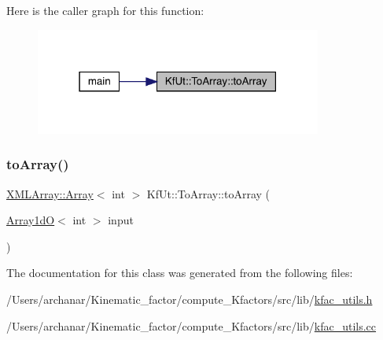 Here is the caller graph for this function\+:
\nopagebreak
\begin{figure}[H]
\begin{center}
\leavevmode
\includegraphics[width=267pt]{d3/dec/classKfUt_1_1ToArray_ac97892c7b8ae265fe9d91d3f823b3f98_icgraph}
\end{center}
\end{figure}
\mbox{\label{classKfUt_1_1ToArray_a272ebce4969f38835c7a503a85a4f8d3}} 
\subsubsection{\texorpdfstring{toArray()}{toArray()}\hspace{0.1cm}{\footnotesize\ttfamily [2/2]}}
{\footnotesize\ttfamily \mbox{\hyperlink{classXMLArray_1_1Array}{X\+M\+L\+Array\+::\+Array}}$<$ int $>$ Kf\+Ut\+::\+To\+Array\+::to\+Array (\begin{DoxyParamCaption}\item[{\mbox{\hyperlink{classADAT_1_1Array1dO}{Array1dO}}$<$ int $>$}]{input }\end{DoxyParamCaption})\hspace{0.3cm}{\ttfamily [static]}}



The documentation for this class was generated from the following files\+:\begin{DoxyCompactItemize}
\item 
/\+Users/archanar/\+Kinematic\+\_\+factor/compute\+\_\+\+Kfactors/src/lib/\mbox{\hyperlink{src_2lib_2kfac__utils_8h}{kfac\+\_\+utils.\+h}}\item 
/\+Users/archanar/\+Kinematic\+\_\+factor/compute\+\_\+\+Kfactors/src/lib/\mbox{\hyperlink{src_2lib_2kfac__utils_8cc}{kfac\+\_\+utils.\+cc}}\end{DoxyCompactItemize}
